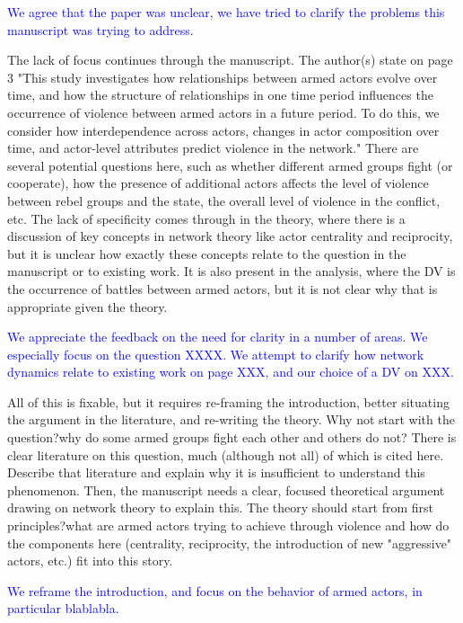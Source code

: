 \documentclass[12pt,onesided,fullpage]{amsart}
\begin{document}
\textcolor{blue}{We agree that the paper was unclear, we have tried to clarify the problems this manuscript was trying to address.}

The lack of focus continues through the manuscript. The author(s) state on page 3 "This study investigates how relationships between armed actors evolve over time, and
how the structure of relationships in one time period influences the occurrence of violence
between armed actors in a future period. To do this, we consider how interdependence
across actors, changes in actor composition over time, and actor-level attributes predict
violence in the network." There are several potential questions here, such as whether different armed groups fight (or cooperate), how the presence of additional actors affects the level of violence between rebel groups and the state, the overall level of violence in the conflict, etc. The lack of specificity comes through in the theory, where there is a discussion of key concepts in network theory like actor centrality and reciprocity, but it is unclear how exactly these concepts relate to the question in the manuscript or to existing work. It is also present in the analysis, where the DV is the occurrence of battles between armed actors, but it is not clear why that is appropriate given the theory.

\textcolor{blue}{We appreciate the feedback on the need for clarity in a number of areas. We especially focus on the question XXXX. We attempt to clarify how network dynamics relate to existing work on page XXX, and our choice of a DV on XXX.}

All of this is fixable, but it requires re-framing the introduction, better situating the argument in the literature, and re-writing the theory. Why not start with the question?why do some armed groups fight each other and others do not? There is clear literature on this question, much (although not all) of which is cited here. Describe that literature and explain why it is insufficient to understand this phenomenon. Then, the manuscript needs a clear, focused theoretical argument drawing on network theory to explain this. The theory should start from first principles?what are armed actors trying to achieve through violence and how do the components here (centrality, reciprocity, the introduction of new "aggressive" actors, etc.) fit into this story.

\textcolor{blue}{We reframe the introduction, and focus on the behavior of armed actors, in particular blablabla.}
\end{document}
